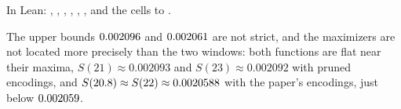 In Lean: , , ,
, ,
, and the cells  to
.

The upper bounds \(0.002096\) and \(0.002061\) are not strict, and the maximizers
are not located more precisely than the two windows: both functions are flat
near their maxima, \(S(21)\approx0.002093\) and \(S(23)\approx0.002092\) with
pruned encodings, and \(S(20.8)\approx S(22)\approx0.0020588\) with the
paper's encodings, just below \(0.002059\).
